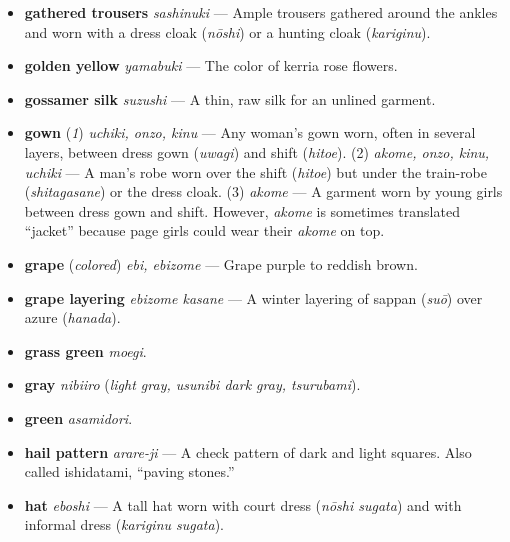 \documentclass{article}
\begin{document}
\begin{multicols}{3}
\begin{footnotesize}
\begin{itemize}[
			label=,
			leftmargin=0em,
			rightmargin=-1.5em,
			itemindent=-2em,
			nosep,
		]
		\item \textbf{gathered trousers} \textit{sashinuki} --- Ample trousers gathered around the ankles and worn with a dress cloak (\textit{nōshi}) or a hunting cloak (\textit{kariginu}).

		\item \textbf{golden yellow} \textit{yamabuki} --- The color of kerria rose flowers.

		\item \textbf{gossamer silk} \textit{suzushi} --- A thin, raw silk for an unlined garment.

		\item \textbf{gown} (\textit{1}) \textit{uchiki, onzo, kinu} --- Any woman's gown worn, often in several layers, between dress gown (\textit{uwagi}) and shift (\textit{hitoe}). (2) \textit{akome, onzo, kinu, uchiki} --- A man's robe worn over the shift (\textit{hitoe}) but under the train-robe (\textit{shitagasane}) or the dress cloak. (3) \textit{akome} --- A garment worn by young girls between dress gown and shift. However, \textit{akome} is sometimes translated “jacket” because page girls could wear their \textit{akome} on top.

		\item \textbf{grape} (\textit{colored}) \textit{ebi, ebizome} --- Grape purple to reddish brown.

		\item \textbf{grape layering} \textit{ebizome kasane} --- A winter layering of sappan (\textit{suō}) over azure (\textit{hanada}).

		\item \textbf{grass green} \textit{moegi}.

		\item \textbf{gray} \textit{nibiiro} (\textit{light gray, \textit{usunibi} dark gray, \textit{tsurubami}}).

		\item \textbf{green} \textit{asamidori}.

		\item \textbf{hail pattern} \textit{arare-ji} --- A check pattern of dark and light squares. Also called ishidatami, “paving stones.”

		\item \textbf{hat} \textit{eboshi} --- A tall hat worn with court dress (\textit{nōshi sugata}) and with informal dress (\textit{kariginu sugata}).


\end{itemize}
\end{footnotesize}
\end{multicols}
\end{document}
